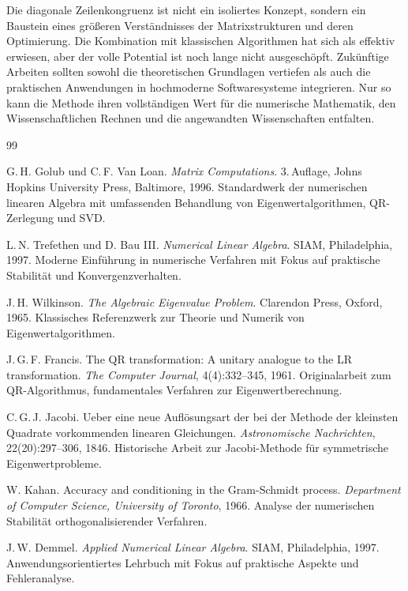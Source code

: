 \documentclass[a4paper,12pt]{article}
\theoremstyle{definition}
\begin{document}
Die diagonale Zeilenkongruenz ist nicht ein isoliertes Konzept, sondern ein Baustein eines größeren Verständnisses der Matrixstrukturen und deren Optimierung. Die Kombination mit klassischen Algorithmen hat sich als effektiv erwiesen, aber der volle Potential ist noch lange nicht ausgeschöpft. Zukünftige Arbeiten sollten sowohl die theoretischen Grundlagen vertiefen als auch die praktischen Anwendungen in hochmoderne Softwaresysteme integrieren. Nur so kann die Methode ihren vollständigen Wert für die numerische Mathematik, den Wissenschaftlichen Rechnen und die angewandten Wissenschaften entfalten.

\begin{thebibliography}{99}

G.\,H. Golub und C.\,F. Van Loan. \textit{Matrix Computations}. 3.\,Auflage, Johns Hopkins University Press, Baltimore, 1996.
\newblock Standardwerk der numerischen linearen Algebra mit umfassenden Behandlung von Eigenwertalgorithmen, QR-Zerlegung und SVD.

L.\,N. Trefethen und D. Bau III. \textit{Numerical Linear Algebra}. SIAM, Philadelphia, 1997.
\newblock Moderne Einführung in numerische Verfahren mit Fokus auf praktische Stabilität und Konvergenzverhalten.

J.\,H. Wilkinson. \textit{The Algebraic Eigenvalue Problem}. Clarendon Press, Oxford, 1965.
\newblock Klassisches Referenzwerk zur Theorie und Numerik von Eigenwertalgorithmen.

J.\,G.\,F. Francis. The QR transformation: A unitary analogue to the LR transformation. \textit{The Computer Journal}, 4(4):332--345, 1961.
\newblock Originalarbeit zum QR-Algorithmus, fundamentales Verfahren zur Eigenwertberechnung.

C.\,G.\,J. Jacobi. Ueber eine neue Auflösungsart der bei der Methode der kleinsten Quadrate vorkommenden linearen Gleichungen. \textit{Astronomische Nachrichten}, 22(20):297--306, 1846.
\newblock Historische Arbeit zur Jacobi-Methode für symmetrische Eigenwertprobleme.

W. Kahan. Accuracy and conditioning in the Gram-Schmidt process. \textit{Department of Computer Science, University of Toronto}, 1966.
\newblock Analyse der numerischen Stabilität orthogonalisierender Verfahren.

J.\,W. Demmel. \textit{Applied Numerical Linear Algebra}. SIAM, Philadelphia, 1997.
\newblock Anwendungsorientiertes Lehrbuch mit Fokus auf praktische Aspekte und Fehleranalyse.


\end{thebibliography}
\end{document}
